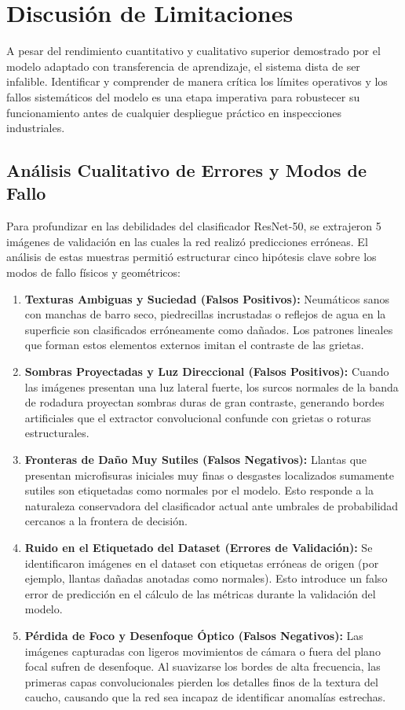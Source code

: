 \section{Discusión de Limitaciones}
A pesar del rendimiento cuantitativo y cualitativo superior demostrado por el modelo adaptado con transferencia de aprendizaje, el sistema dista de ser infalible. Identificar y comprender de manera crítica los límites operativos y los fallos sistemáticos del modelo es una etapa imperativa para robustecer su funcionamiento antes de cualquier despliegue práctico en inspecciones industriales.

\subsection{Análisis Cualitativo de Errores y Modos de Fallo}
Para profundizar en las debilidades del clasificador ResNet-50, se extrajeron 5 imágenes de validación en las cuales la red realizó predicciones erróneas. El análisis de estas muestras permitió estructurar cinco hipótesis clave sobre los modos de fallo físicos y geométricos:

\begin{enumerate}
    \item \textbf{Texturas Ambiguas y Suciedad (Falsos Positivos):} Neumáticos sanos con manchas de barro seco, piedrecillas incrustadas o reflejos de agua en la superficie son clasificados erróneamente como dañados. Los patrones lineales que forman estos elementos externos imitan el contraste de las grietas.
    \item \textbf{Sombras Proyectadas y Luz Direccional (Falsos Positivos):} Cuando las imágenes presentan una luz lateral fuerte, los surcos normales de la banda de rodadura proyectan sombras duras de gran contraste, generando bordes artificiales que el extractor convolucional confunde con grietas o roturas estructurales.
    \item \textbf{Fronteras de Daño Muy Sutiles (Falsos Negativos):} Llantas que presentan microfisuras iniciales muy finas o desgastes localizados sumamente sutiles son etiquetadas como normales por el modelo. Esto responde a la naturaleza conservadora del clasificador actual ante umbrales de probabilidad cercanos a la frontera de decisión.
    \item \textbf{Ruido en el Etiquetado del Dataset (Errores de Validación):} Se identificaron imágenes en el dataset con etiquetas erróneas de origen (por ejemplo, llantas dañadas anotadas como normales). Esto introduce un falso error de predicción en el cálculo de las métricas durante la validación del modelo.
    \item \textbf{Pérdida de Foco y Desenfoque Óptico (Falsos Negativos):} Las imágenes capturadas con ligeros movimientos de cámara o fuera del plano focal sufren de desenfoque. Al suavizarse los bordes de alta frecuencia, las primeras capas convolucionales pierden los detalles finos de la textura del caucho, causando que la red sea incapaz de identificar anomalías estrechas.
\end{enumerate}

